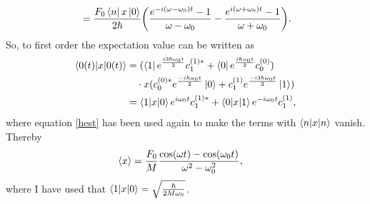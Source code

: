 \begin{example}
\begin{equation}
\begin{split}
			&=\frac{F_0\bra{n}x\ket{0}}{2\hbar}\bigg(\frac{e^{-i(\omega-\omega_0)t}-1}{\omega-\omega_0}-\frac{e^{i(\omega+\omega_0)t}-1}{\omega+\omega_0}\bigg).\\
		\end{split}
	\end{equation} 
	So, to first order the expectation value can be written as
	\begin{equation}
		\begin{split}
			\braket{0(t)|x|0(t)}&=(\bra{1}e^{\frac{i3\hbar\omega_0t}{2}}c_1^{(1)*}+\bra{0}e^{\frac{i\hbar\omega_0t}{2}}c_0^{(0)})\\
			&\quad\cdot x(c_0^{(0)*}e^{\frac{-i\hbar\omega_0t}{2}}\ket{0}+c_1^{(1)}e^{\frac{-i3\hbar\omega_0t}{2}}\ket{1})\\
			&=\braket{1|x|0}e^{i\omega_0t}c_1^{(1)*}+\braket{0|x|1}e^{-i\omega_0t}c_1^{(1)},
		\end{split}
	\end{equation} 
	where equation \eqref{hest} has been used again to make the terms with $\braket{n|x|n}$ vanish. Thereby
	\begin{equation}
		\begin{split}
			\braket{x}&=\frac{F_0}{M}\frac{\cos(\omega t)-\cos(\omega_0t)}{\omega^2-\omega_0^2},
		\end{split}
	\end{equation} 
	where I have used that $\braket{1|x|0}=\sqrt{\frac{\hbar}{2M\omega_0}}$.
\end{example}

